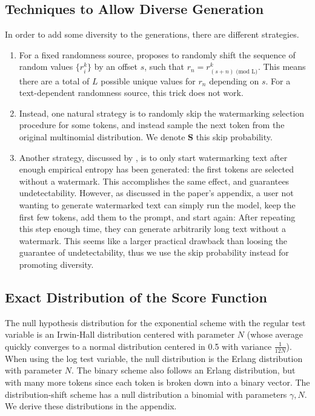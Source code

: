 
\subsection{Techniques to Allow Diverse Generation}\label{app:ssec:diverse}

In order to add some diversity to the generations, there are different strategies.
\begin{enumerate}[leftmargin=\itemlm,itemsep=2pt]
    \item For a fixed randomness source, \citet{kuditipudi_robust_2023} proposes to randomly shift the sequence of random values $\{r^k_i\}$ by an offset $s$, such that $r_n = r^k_{(s+n) \text{ (mod L)}}$. This means there are a total of $L$ possible unique values for $r_n$ depending on $s$. For a text-dependent randomness source, this trick does not work. 
    \item Instead, one natural strategy is to randomly skip the watermarking selection procedure for some tokens, and instead sample the next token from the original multinomial distribution. We denote \textbf{S} this skip probability. 
    \item Another strategy, discussed by \citet{christ_undetectable_2023}, is to only start watermarking text after enough empirical entropy has been generated: the first tokens are selected without a watermark. This accomplishes the same effect, and guarantees undetectability. However, as discussed in the paper's appendix, a user not wanting to generate watermarked text can simply run the model, keep the first few tokens, add them to the prompt, and start again: After repeating this step enough time, they can generate arbitrarily long text without a watermark. This seems like a larger practical drawback than loosing the guarantee of undetectability, thus we use the skip probability instead for promoting diversity. 
\end{enumerate}

\subsection{Exact Distribution of the Score Function}\label{app:ssec:exact_dist}

The null hypothesis distribution for the exponential scheme with the regular test variable is an Irwin-Hall distribution centered with parameter $N$ (whose average quickly converges to a normal distribution centered in 0.5 with variance $\frac{1}{12N}$).
%
When using the log test variable, the null distribution is the Erlang distribution with parameter $N$. The binary scheme also follows an Erlang distribution, but with many more tokens since each token is broken down into a binary vector. The distribution-shift scheme has a null distribution a binomial with parameters $\gamma, N$. We derive these distributions in the appendix.

